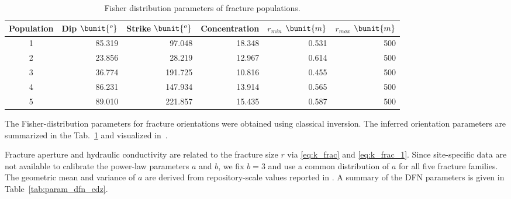 \begin{table}[ht]
    \caption{Fisher distribution parameters of fracture populations.}
    \label{tab:fisher_params}  
    \centering
    \begin{tabular}{crrrrr}
    \toprule
    Population & Dip $\bunit{^o}$ & Strike $\bunit{^o}$ & Concentration & $r_{min}$ $\bunit{m}$ & $r_{max}$ $\bunit{m}$\\
    \midrule
    1 & 85.319 & 97.048  & 18.348 & 0.531 & 500 \\
    2 & 23.856 & 28.219  & 12.967 & 0.614 & 500 \\
    3 & 36.774 & 191.725 & 10.816 & 0.455 & 500 \\
    4 & 86.231 & 147.934 & 13.914 & 0.565 & 500 \\
    5 & 89.010 & 221.857 & 15.435 & 0.587 & 500 \\
    \bottomrule
    \end{tabular}
\end{table}

The Fisher-distribution parameters for fracture orientations were obtained using classical inversion.
The inferred orientation parameters are summarized in the Tab.~\ref{tab:fisher_params} and visualized in~.

Fracture aperture and hydraulic conductivity are related to the fracture size $r$ via \eqref{eq:k_frac} and \eqref{eq:k_frac_1}.
Since site-specific data are not available to calibrate the power-law parameters $a$ and $b$, we fix $b=3$ and use a common distribution of $a$
for all five fracture families. The geometric mean and variance of $a$ are derived from repository-scale values reported in \cite{Ohman_Site_2010}.
A summary of the DFN parameters is given in Table~\ref{tab:param_dfn_edz}.



